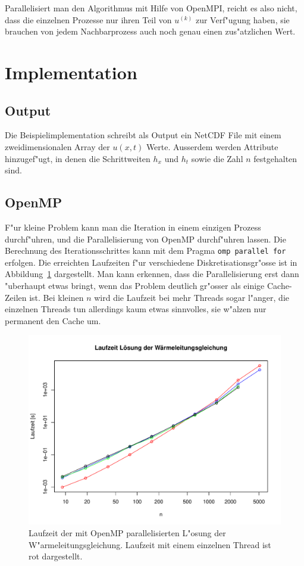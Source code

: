 Parallelisiert man den Algorithmus mit Hilfe von OpenMPI, reicht es also
nicht, dass die einzelnen Prozesse nur ihren Teil von
$u^{(k)}$ zur Verf"ugung haben, sie brauchen von jedem Nachbarprozess
auch noch genau einen zus"atzlichen Wert.

\section{Implementation}
\subsection{Output}
Die Beispielimplementation schreibt als Output ein NetCDF File mit einem
zweidimensionalen Array der $u(x,t)$ Werte.
Ausserdem werden Attribute hinzugef"ugt, in denen die Schrittweiten
$h_x$ und $h_t$ sowie die Zahl $n$ festgehalten sind.

\subsection{OpenMP}
F"ur kleine Problem kann man die Iteration in einem einzigen Prozess
durchf"uhren, und die Parallelisierung von OpenMP durchf"uhren lassen.
Die Berechnung des Iterationsschrittes kann mit dem Pragma
{\tt omp parallel for} erfolgen.
Die erreichten Laufzeiten f"ur verschiedene Diskretisationsgr"osse ist
in Abbildung~\ref{heat:laufzeit} dargestellt.
Man kann erkennen, dass die Parallelisierung erst dann "uberhaupt etwas
bringt, wenn das Problem deutlich gr"osser als einige Cache-Zeilen ist.
Bei kleinen $n$ wird die Laufzeit bei mehr Threads sogar l"anger, die
einzelnen Threads tun allerdings kaum etwas sinnvolles, sie w"alzen nur
permanent den Cache um.
\begin{figure}
\begin{center}
\includegraphics[width=\hsize]{heat/results-heat.pdf}
\end{center}
\caption{Laufzeit der mit OpenMP parallelisierten L"osung der
W"armeleitungsgleichung. Laufzeit mit einem einzelnen Thread ist rot
dargestellt.
\label{heat:laufzeit}}
\end{figure}

